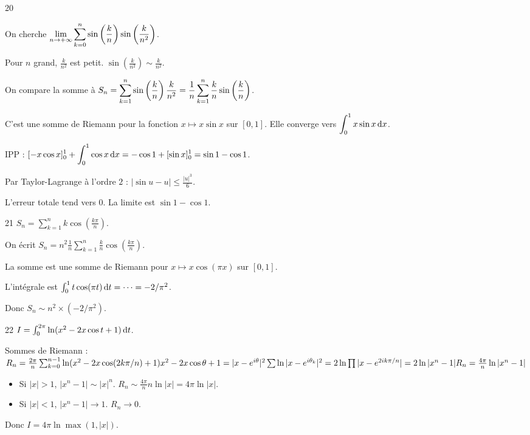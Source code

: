 \begin{correction}{20}

    On cherche $\displaystyle \lim_{n\to + \infty} \sum_{k=0}^n \sin\left(\frac k n\right) \sin\left(\frac k {n^2}\right)$.

    Pour $n$ grand, $\frac k {n^2}$ est petit. $\sin\left(\frac k {n^2}\right) \sim \frac k {n^2}$.

    On compare la somme à $\displaystyle S_n = \sum_{k=1}^n \sin\left(\frac k n\right) \frac{k}{n^2} = \frac{1}{n} \sum_{k=1}^n \frac{k}{n} \sin\left(\frac{k}{n}\right)$.

    C'est une somme de Riemann pour la fonction $x \mapsto x \sin x$ sur $[0,1]$.
    Elle converge vers $\displaystyle \int_0^1 x \sin x \,\mathrm{d}x$.

    IPP : $\displaystyle [-x\cos x]_0^1 + \int_0^1 \cos x \,\mathrm{d}x = -\cos 1 + [\sin x]_0^1 = \sin 1 - \cos 1$.

    Par Taylor-Lagrange à l'ordre $2$ : $|\sin u - u| \le \frac{|u|^3}{6}$.

    L'erreur totale tend vers 0. La limite est $\sin 1 - \cos 1$.
\end{correction}

\begin{correction}{21}
    $S_n = \sum_{k=1}^n k \cos(\frac{k\pi}{n})$.

    On écrit $S_n = n^2 \frac{1}{n} \sum_{k=1}^n \frac{k}{n} \cos(\frac{k\pi}{n})$.

    La somme est une somme de Riemann pour $x \mapsto x \cos(\pi x)$ sur $[0,1]$.

    L'intégrale est $\int_0^1 t \cos(\pi t) \,\mathrm{d}t = \dots = -2/\pi^2$.

    Donc $S_n \sim n^2 \times (-2/\pi^2)$.
\end{correction}

\begin{correction}{22}
    $I = \int_0^{2\pi} \ln(x^2 - 2x \cos t + 1) \,\mathrm{d}t$.

    Sommes de Riemann : 
    \begin{math}
        R_n = \frac{2\pi}{n} \sum_{k=0}^{n-1} \ln(x^2 - 2x \cos(2k\pi/n) + 1) \\
        x^2 - 2x \cos \theta + 1 = |x - e^{i\theta}|^2 \\
        \sum \ln |x-e^{i\theta_k}|^2 = 2 \ln \prod |x-e^{2ik\pi/n}| = 2 \ln |x^n-1| \\
        R_n = \frac{4\pi}{n} \ln |x^n-1|
    \end{math}
    \begin{itemize}
    \item 
        Si $|x| > 1$, $|x^n-1| \sim |x|^n$. $R_n \sim \frac{4\pi}{n} n \ln |x| = 4\pi \ln |x|$.
    \item
        Si $|x| < 1$, $|x^n-1| \to 1$. $R_n \to 0$.
    \end{itemize}
    Donc $I = 4\pi \ln \max(1, |x|)$.
\end{correction}
